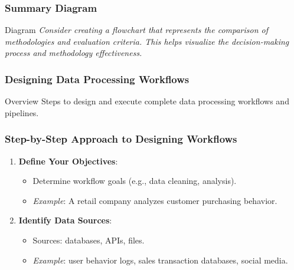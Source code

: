 \documentclass[aspectratio=169]{beamer}
\begin{document}
\begin{frame}[fragile]
    \frametitle{Summary Diagram}
    \begin{block}{Diagram}
        \textit{Consider creating a flowchart that represents the comparison of methodologies and evaluation criteria. This helps visualize the decision-making process and methodology effectiveness.}
    \end{block}
\end{frame}

\begin{frame}[fragile]
    \frametitle{Designing Data Processing Workflows}
    \begin{block}{Overview}
        Steps to design and execute complete data processing workflows and pipelines.
    \end{block}
\end{frame}

\begin{frame}[fragile]
    \frametitle{Step-by-Step Approach to Designing Workflows}
    \begin{enumerate}
        \item \textbf{Define Your Objectives}:
        \begin{itemize}
            \item Determine workflow goals (e.g., data cleaning, analysis).
            \item \textit{Example}: A retail company analyzes customer purchasing behavior.
        \end{itemize}
        
        \item \textbf{Identify Data Sources}:
        \begin{itemize}
            \item Sources: databases, APIs, files.
            \item \textit{Example}: user behavior logs, sales transaction databases, social media.
        \end{itemize}
    \end{enumerate}
\end{frame}
\end{document}
